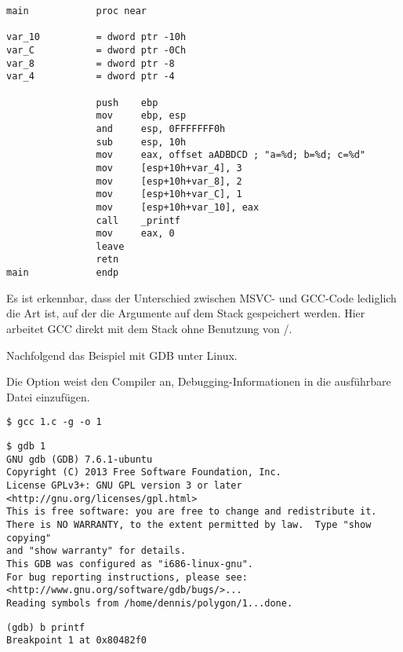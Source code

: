 

\begin{lstlisting}
main            proc near

var_10          = dword ptr -10h
var_C           = dword ptr -0Ch
var_8           = dword ptr -8
var_4           = dword ptr -4

                push    ebp
                mov     ebp, esp
                and     esp, 0FFFFFFF0h
                sub     esp, 10h
                mov     eax, offset aADBDCD ; "a=%d; b=%d; c=%d"
                mov     [esp+10h+var_4], 3
                mov     [esp+10h+var_8], 2
                mov     [esp+10h+var_C], 1
                mov     [esp+10h+var_10], eax
                call    _printf
                mov     eax, 0
                leave
                retn
main            endp
\end{lstlisting}

Es ist erkennbar, dass der Unterschied zwischen MSVC- und GCC-Code lediglich die Art ist,
auf der die Argumente auf dem Stack gespeichert werden.
Hier arbeitet GCC direkt mit dem Stack ohne Benutzung von \PUSH/\POP.


Nachfolgend das Beispiel mit \ac{GDB} unter Linux.

Die Option  weist den Compiler an, Debugging-Informationen in die ausführbare Datei einzufügen.

\begin{lstlisting}
$ gcc 1.c -g -o 1
\end{lstlisting}

\begin{lstlisting}
$ gdb 1
GNU gdb (GDB) 7.6.1-ubuntu
Copyright (C) 2013 Free Software Foundation, Inc.
License GPLv3+: GNU GPL version 3 or later <http://gnu.org/licenses/gpl.html>
This is free software: you are free to change and redistribute it.
There is NO WARRANTY, to the extent permitted by law.  Type "show copying"
and "show warranty" for details.
This GDB was configured as "i686-linux-gnu".
For bug reporting instructions, please see:
<http://www.gnu.org/software/gdb/bugs/>...
Reading symbols from /home/dennis/polygon/1...done.
\end{lstlisting}

\begin{lstlisting}[caption=Setzen eines Breakpoints auf \printf]
(gdb) b printf
Breakpoint 1 at 0x80482f0
\end{lstlisting}

